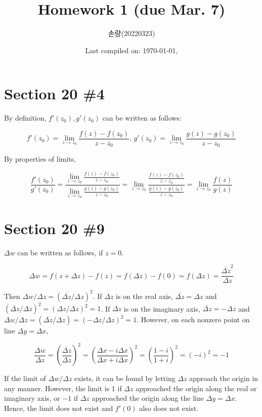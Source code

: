 \documentclass{scrartcl}
\title{Homework 1 (due Mar. 7)}
\author{손량(20220323)}
\date{Last compiled on: \today, \currenttime}
\begin{document}
\maketitle

\section{Section 20 \#4}
By definition, \(f'(z_0), g'(z_0)\) can be written as follows:

\[
  f'(z_0) = \lim_{z \to z_0} \frac{f(z) - f(z_0)}{z - z_0},\, g'(z_0) = \lim_{z \to z_0} \frac{g(z) - g(z_0)}{z - z_0}
\]

By properties of limits,

\[
  \frac{f'(z_0)}{g'(z_0)} = \frac{\lim_{z \to z_0} \frac{f(z) - f(z_0)}{z - z_0}}{\lim_{z \to z_0} \frac{g(z) - g(z_0)}{z - z_0}} = \lim_{z \to z_0} \frac{\frac{f(z) - f(z_0)}{z - z_0}}{\frac{g(z) - g(z_0)}{z - z_0}} = \lim_{z \to z_0} \frac{f(z)}{g(z)}
\]

\section{Section 20 \#9}
\(\Delta w\) can be written as follows, if \(z = 0\).

\[
  \Delta w = f(z + \Delta z) - f(z) = f(\Delta z) - f(0) = f(\Delta z) = \frac{\overline{\Delta z}^2}{\Delta z}
\]

Then \(\Delta w/\Delta z = \left(\overline{\Delta z} / \Delta z\right)^2\). If \(\Delta z\) is on the real axis, \(\overline{\Delta z} = \Delta z\) and \(\left(\overline{\Delta z} / \Delta z\right)^2 = \left( \Delta z / \Delta z \right)^2 = 1\). If \(\Delta z\) is on the imaginary axis, \(\overline{\Delta z} = -\Delta z\) and \(\Delta w / \Delta z = \left( \overline{\Delta z} / \Delta z \right) = \left( -\Delta z / \Delta z \right)^2 = 1\). However, on each nonzero point on line \(\Delta y = \Delta x\),

\[
  \frac{\Delta w}{\Delta z} = \left( \frac{\overline{\Delta z}}{\Delta z} \right)^2 = \left( \frac{\Delta x - i\Delta x}{\Delta x + i\Delta x} \right)^2 = \left( \frac{1 - i}{1 + i} \right)^2 = (-i)^2 = -1
\]

If the limit of \(\Delta w / \Delta z\) exists, it can be found by letting \(\Delta z\) approach the origin in any manner. However, the limit is 1 if \(\Delta z\) approached the origin along the real or imaginary axis, or \(-1\) if \(\Delta z\) approached the origin along the line \(\Delta y = \Delta x\). Hence, the limit does not exist and \(f'(0)\) also does not exist.
\end{document}
